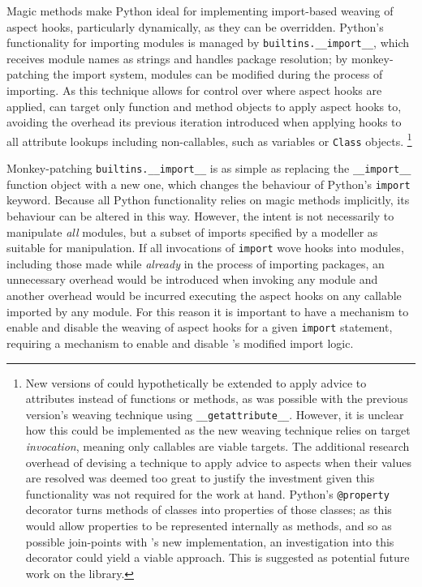 Magic methods make Python ideal for implementing import-based weaving of aspect
hooks, particularly dynamically, as they can be overridden. Python's
functionality for importing modules is managed by
\lstinline{builtins.__import__}, which receives module names as strings and
handles package resolution; by monkey-patching the import system, modules can be
modified during the process of importing. As this technique allows for control
over where aspect hooks are applied, \pdsf can target only function and method
objects to apply aspect hooks to, avoiding the overhead its previous iteration
introduced when applying hooks to all attribute lookups including non-callables,
such as variables or \lstinline{Class} objects. \footnote{New versions of
\pdsf{} could hypothetically be extended to apply advice to attributes instead
of functions or methods, as was possible with the previous version's weaving
technique using \lstinline{__getattribute__}. However, it is unclear how this
could be implemented as the new weaving technique relies on target
\emph{invocation}, meaning only callables are viable targets. The additional
research overhead of devising a technique to apply advice to aspects when their
values are resolved was deemed too great to justify the investment given this
functionality was not required for the work at hand. Python's
\lstinline{@property} decorator turns methods of classes into properties of
those classes; as this would allow properties to be represented internally as
methods, and so as possible join-points with \pdsf{}'s new implementation, an
investigation into this decorator could yield a viable approach. This is
suggested as potential future work on the \pdsf{} library.}

Monkey-patching \lstinline{builtins.__import__} is as simple as replacing the
\lstinline{__import__} function object with a new one, which changes the
behaviour of Python's \lstinline{import} keyword. Because all Python
functionality relies on magic methods implicitly, its behaviour can be altered
in this way. However, the intent is not necessarily to manipulate \emph{all}
modules, but a subset of imports specified by a modeller as suitable for
manipulation. If all invocations of \lstinline{import} wove hooks into modules,
including those made while \emph{already} in the process of importing packages,
an unnecessary overhead would be introduced when invoking any module and another
overhead would be incurred executing the aspect hooks on any callable imported
by any module. For this reason it is important to have a mechanism to enable and
disable the weaving of aspect hooks for a given \lstinline{import} statement,
requiring a mechanism to enable and disable \pdsf{}'s modified import logic.

